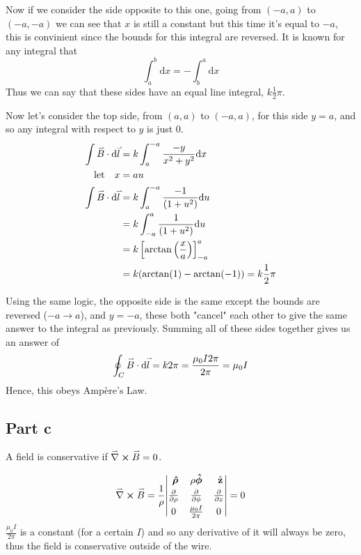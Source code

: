 \documentclass{article}
\newcommand{\phat}{\ \boldsymbol{\hat{\phi}}}
\newcommand{\rohat}{\ \boldsymbol{\hat{\rho}}}
\newcommand{\zhat}{\ {\hat{\textbf{z}}}}
\renewcommand{\d}{\text{d}}
\renewcommand{\vec}[1]{\accentset{\rightharpoonup}{#1}}
\newcommand{\del}{\vec{\nabla}}
\newcommand{\dvecdot}[2]{\vec{#1}\cdot\d \vec{#2}}
\begin{document}
Now if we consider the side opposite to this one, going from $(-a, a)$ to $(-a, -a)$ we can see that $x$ is still 
a constant but this time it's equal to $-a$, this is convinient since the bounds for this integral are reversed.
It is known for any integral that 
$$\int_a^b \d x =  - \int_b^a \d x$$
Thus we can say that these sides have an equal line integral, $k\frac{1}{2}\pi$.
\newline

Now let's consider the top side, from $(a, a)$ to $(-a, a)$, for this side $y = a$, and so any integral with 
respect to $y$ is just 0. 
\begin{align*}
    \int \dvecdot{B}{l} &= k \int_{a}^{-a} \frac{-y}{x^2+y^2}\d x\\
    \text{let}\quad x &= au\\
    \int \dvecdot{B}{l} &= k \int_{a}^{-a} \frac{-1}{(1+u^2)}\d u\\
    &= k \int_{-a}^{a} \frac{1}{(1+u^2)}\d u\\
    &= k \left[\arctan\left(\frac{x}{a}\right)\right]_{-a}^{a} \\
    &= k (\arctan(1) - \arctan(-1)) = k\frac{1}{2}\pi\\
\end{align*}

Using the same logic, the opposite side is the same except the bounds are reversed ($-a \rightarrow a$),
and $y = -a$, these both "cancel" each other to give the same answer to the integral as previously. 
Summing all of these sides together gives us an answer of 
\begin{align*}
    \oint_C \dvecdot{B}{l} = k2\pi = \frac{\mu_0 I 2\pi}{2\pi} = \mu_0 I
\end{align*}
Hence, this obeys Ampère's Law. 

\subsection*{Part c}
A field is conservative if $\del \cross \vec{B} = 0$.

\begin{align*}
    \del \cross \vec{B} &= \frac{1}{\rho}
    {\begin{vmatrix}
        \vspace{0.1cm}
        \rohat & \rho {\mkern-6mu} \phat & \zhat\\
        \vspace{0.1cm}
        \pdv{}{\rho} & \pdv{}{\phi} & \pdv{}{z}\\
        {0} & \frac{\mu_0 I}{2\pi} & 0\\
    \end{vmatrix}} = 0\\
\end{align*}
$\frac{\mu_0 I}{2\pi}$ is a constant (for a certain $I$) and so any derivative of it will always be zero, 
thus the field is conservative outside of the wire. 
\end{document}
